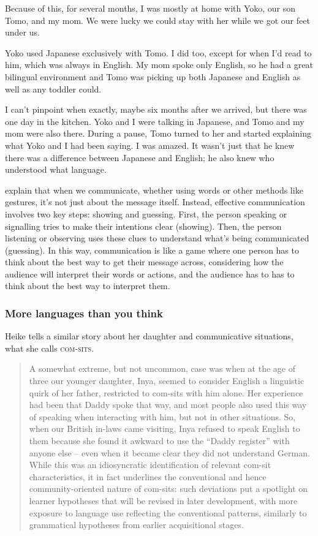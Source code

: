 Because of this, for several months, I was mostly at home with Yoko, our son Tomo, and my mom. We were lucky we could stay with her while we got our feet under us.

Yoko used Japanese exclusively with Tomo. I did too, except for when I'd read to him, which was always in English. My mom spoke only English, so he had a great bilingual environment and Tomo was picking up both Japanese and English as well as any toddler could.

I can't pinpoint when exactly, maybe six months after we arrived, but there was one day in the kitchen. Yoko and I were talking in Japanese, and Tomo and my mom were also there. During a pause, Tomo turned to her and started explaining what Yoko and I had been saying. I was amazed. It wasn't just that he knew there was a difference between Japanese and English; he also knew who understood what language.

\citet{Smith2019a} explain that when we communicate, whether using words or other methods like gestures, it's not just about the message itself. Instead, effective communication involves two key steps: showing and guessing. First, the person speaking or signalling tries to make their intentions clear (showing). Then, the person listening or observing uses these clues to understand what's being communicated (guessing). In this way, communication is like a game where one person has to think about the best way to get their message across, considering how the audience will interpret their words or actions, and the audience has to has to think about the best way to interpret them.

\subsubsection{More languages than you think}

Heike \citet{Wiese2023} tells a similar story about her daughter and communicative situations, what she calls \textsc{com-sits}.

\begin{quote}
    A somewhat extreme, but not uncommon, case was when at the age of three our younger daughter, Inya, seemed to consider English a linguistic quirk of her father, restricted to com-sits with him alone. Her experience had been that Daddy spoke that way, and most people also used this way of speaking when interacting with him, but not in other situations. So, when our British in-laws came visiting, Inya refused to speak English to them because she found it awkward to use the ``Daddy register'' with anyone else -- even when it became clear they did not understand German. While this was an idiosyncratic identification of relevant com-sit characteristics, it in fact underlines the conventional and hence community-oriented nature of com-sits: such deviations put a spotlight on learner hypotheses that will be revised in later development, with more exposure to language use reflecting the conventional patterns, similarly to grammatical hypotheses from earlier acquisitional stages. \hfill\citep[42--43]{Wiese2023}
\end{quote}

